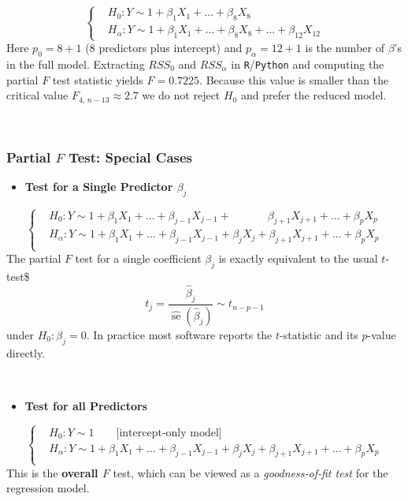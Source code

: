 \documentclass[
]{book}
\providecommand{\tightlist}{%
  \setlength{\itemsep}{0pt}\setlength{\parskip}{0pt}}
\begin{document}
\[\begin{cases}
 &H_0: Y \sim  1+  \beta_{1} X_{1} + \ldots + \beta_{8}X_{8} \\
 & H_{\alpha}:  Y \sim  1+  \beta_1 X_1 + \ldots + \beta_{8}X_{8}+ \ldots + \beta_{12} X_{12} 
 \end{cases} 
 \]
Here \(p_0 = 8+1\) (8 predictors plus intercept) and \(p_{\alpha}=12+1\) is the number of \(\beta\)'s in the full model. Extracting \(RSS_0\) and \(RSS_{\alpha}\) in \texttt{R}/\texttt{Python} and computing the partial \(F\) test statistic yields \(F = 0.7225\). Because this value is smaller than the critical value \(F_{4,\, n-13} \approx 2.7\) we do not reject \(H_0\) and prefer the reduced model.

~

\subsubsection*{\texorpdfstring{Partial \(F\) Test: Special Cases }{Partial F Test: Special Cases }}\label{partial-f-test-special-cases}

\begin{itemize}
\tightlist
\item
  \textbf{Test for a Single Predictor \(\beta_j\)}
\end{itemize}

\[\begin{cases}
 & H_0: Y \sim  1+  \beta_1 X_1 + \ldots + \beta_{j-1}X_{j-1} + \qquad \quad \; \beta_{j+1} X_{j+1} + \ldots + \beta_p X_p \\
 & H_{\alpha}:  Y \sim  1+  \beta_1 X_1 + \ldots + \beta_{j-1}X_{j-1} +  \beta_{j} X_{j} + \beta_{j+1} X_{j+1} + \ldots + \beta_p X_p \\
 \end{cases} 
 \]
The partial \(F\) test for a single coefficient \(\beta_j\) is exactly equivalent to the usual \(t\)-test\$
\[t_j = \frac{\hat{\beta}_j}{\widehat{\operatorname{se}}(\hat{\beta}_j)} \sim t_{n-p-1}\]
under \(H_0: \beta_j = 0\). In practice most software reports the \(t\)-statistic and its \(p\)-value directly.

~

\begin{itemize}
\tightlist
\item
  \textbf{Test for all Predictors}
\end{itemize}

\[\begin{cases}
 &H_0: Y \sim  1 \qquad \text{[intercept-only model]} \\
 & H_{\alpha}:  Y \sim  1+  \beta_1 X_1 + \ldots + \beta_{j-1}X_{j-1} +  \beta_{j} X_{j} + \beta_{j+1} X_{j+1} + \ldots + \beta_p X_p \\
 \end{cases} 
 \]
This is the \textbf{overall \(F\)} test, which can be viewed as a \emph{goodness-of-fit test} for the regression model.
\end{document}
